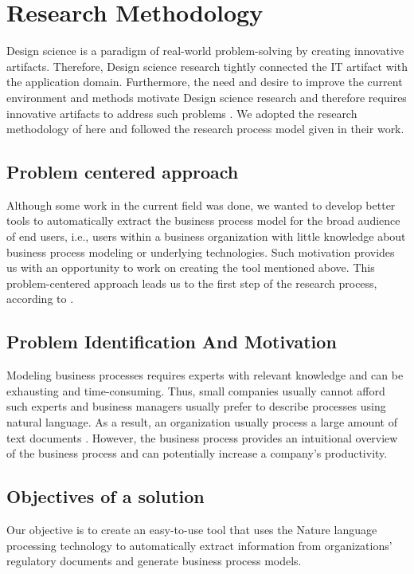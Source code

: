 \chapter{Research Methodology}

Design science is a paradigm of real-world problem-solving by creating innovative artifacts. Therefore, Design science research tightly connected the IT artifact with the application domain. Furthermore, the need and desire to improve the current environment and methods motivate Design science research and therefore requires innovative artifacts to address such problems \cite{DSM_1}. We adopted the research methodology of \cite{DSM_2} here and followed the research process model given in their work.

\section{Problem centered approach}
Although some work in the current field was done, we wanted to develop better tools to automatically extract the business process model for the broad audience of end users, i.e., users within a business organization with little knowledge about business process modeling or underlying technologies. Such motivation provides us with an opportunity to work on creating the tool mentioned above. This problem-centered approach leads us to the first step of the research process, according to \cite{DSM_2}.

\section{Problem Identification And Motivation}
Modeling business processes requires experts with relevant knowledge and can be exhausting and time-consuming. Thus, small companies usually cannot afford such experts and business managers usually prefer to describe processes using natural language. As a result, an organization usually process a large amount of text documents  \cite{literature_review_2}. However, the business process provides an intuitional overview of the business process and can potentially increase a company's productivity.

\section{Objectives of a solution}
Our objective is to create an easy-to-use tool that uses the Nature language processing technology to automatically extract information from organizations' regulatory documents and generate business process models.

